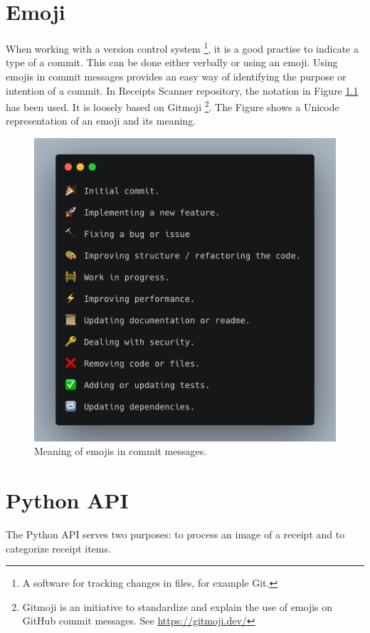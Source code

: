 \documentclass[
  digital, %
  table,   %
  oneside, %
  lof,     %
  lot,     %
]{fithesis3}
\begin{document}
\chapter{Emoji}
When working with a version control system \footnote{A software for tracking changes in files, for example Git.}, it is a good practise to indicate a type of a commit. This can be done either verbally or using an emoji.
Using emojis in commit messages provides an easy way of identifying the purpose or intention of a commit. In Receipts Scanner repository, the notation in Figure \ref{fig:emoji_commits} has been used. It is loosely based on Gitmoji \footnote{Gitmoji is an initiative to standardize and explain the use of emojis on GitHub commit messages. See \url{https://gitmoji.dev/}}. The Figure shows a Unicode representation of an emoji and its meaning.
    \begin{figure}
        \begin{center}
            \includegraphics[width=\textwidth]{figures/other/Emoji_commits}
        \end{center}
        \caption{Meaning of emojis in commit messages.}
        \label{fig:emoji_commits}
    \end{figure}


\chapter{Python API}
The Python API serves two purposes: to process an image of a receipt and to categorize receipt items.
\end{document}
